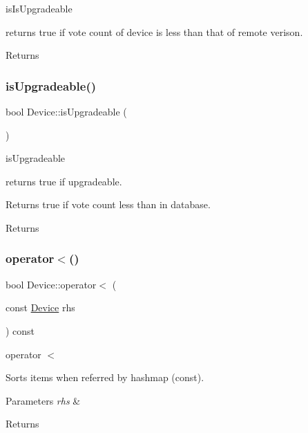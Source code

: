 is\+Is\+Upgradeable 

returns true if vote count of device is less than that of remote verison. \begin{DoxyReturn}{Returns}

\end{DoxyReturn}
\mbox{\label{classDevice_a1078839b751f8366b5170d4daefa26b4}} 
\subsubsection{\texorpdfstring{is\+Upgradeable()}{isUpgradeable()}}
{\footnotesize\ttfamily bool Device\+::is\+Upgradeable (\begin{DoxyParamCaption}{ }\end{DoxyParamCaption})}



is\+Upgradeable 

returns true if upgradeable.

Returns true if vote count less than in database. \begin{DoxyReturn}{Returns}

\end{DoxyReturn}
\mbox{\label{classDevice_acd077de5b2954ce456927e021c5de5df}} 
\subsubsection{\texorpdfstring{operator$<$()}{operator<()}\hspace{0.1cm}{\footnotesize\ttfamily [1/2]}}
{\footnotesize\ttfamily bool Device\+::operator$<$ (\begin{DoxyParamCaption}\item[{const \hyperlink{classDevice}{Device}}]{rhs }\end{DoxyParamCaption}) const}



operator $<$ 

Sorts items when referred by hashmap (const). 
\begin{DoxyParams}{Parameters}
{\em rhs} & \\
\hline
\end{DoxyParams}
\begin{DoxyReturn}{Returns}

\end{DoxyReturn}
\mbox{\label{classDevice_a660d5da7a710da202ac6c58766370283}} 
